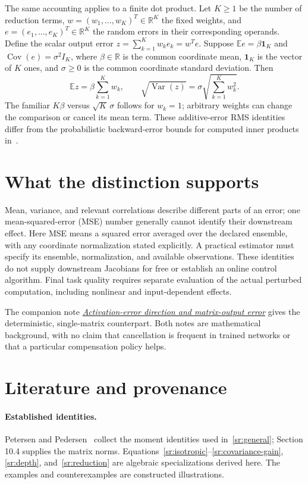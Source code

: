 \documentclass[10pt,a4paper]{article}
\newcommand{\R}{\mathbb{R}}
\newcommand{\E}{\mathbb{E}}
\DeclareMathOperator{\Cov}{Cov}
\begin{document}
The same accounting applies to a finite dot product. Let $K\geq1$ be the
number of reduction terms, $w=(w_1,\ldots,w_K)^T\in\R^K$ the fixed weights,
and $e=(e_1,\ldots,e_K)^T\in\R^K$ the random errors in their corresponding
operands. Define the scalar output error $z=\sum_{k=1}^K w_ke_k=w^Te$.
Suppose $\E e=\beta\mathbf1_K$ and $\Cov(e)=\sigma^2I_K$, where
$\beta\in\R$ is the common coordinate mean, $\mathbf1_K$ is the vector of
$K$ ones, and $\sigma\geq0$ is the common coordinate standard deviation.
Then
\begin{equation}
 \E z=\beta\sum_{k=1}^K w_k,\qquad
 \sqrt{\operatorname{Var}(z)}=\sigma\sqrt{\sum_{k=1}^K w_k^2}.
 \label{sr:reduction}
\end{equation}
The familiar $K\beta$ versus $\sqrt K\,\sigma$ follows for $w_k=1$;
arbitrary weights can change the comparison or cancel its mean term.
These additive-error RMS identities differ from the probabilistic
backward-error bounds for computed inner products
in~\cite[Section 3.1]{higham2019probabilistic}.

\section{What the distinction supports}
Mean, variance, and relevant correlations describe different parts of an error;
one mean-squared-error (MSE) number generally cannot identify their downstream
effect. Here MSE means a squared error averaged over the declared ensemble,
with any coordinate normalization stated explicitly. A practical
estimator must specify its ensemble, normalization, and available observations.
These identities do not supply downstream Jacobians for free or establish an
online control algorithm. Final task quality requires separate evaluation of
the actual perturbed computation, including nonlinear and input-dependent effects.

The companion note
\href{activation-error-direction.pdf}{\emph{Activation-error direction and
matrix-output error}} gives the deterministic, single-matrix counterpart.
Both notes are mathematical background, with no claim that cancellation is
frequent in trained networks or that a particular compensation policy helps.

\section{Literature and provenance}
\paragraph{Established identities.}
Petersen and Pedersen~\cite{petersen2012matrixcookbook} collect the moment
identities used in~\eqref{sr:general}; Section 10.4 supplies the matrix norms.
Equations~\eqref{sr:isotropic}--\eqref{sr:covariance-gain},
\eqref{sr:depth}, and~\eqref{sr:reduction} are algebraic specializations
derived here. The examples and counterexamples are constructed illustrations.
\end{document}
